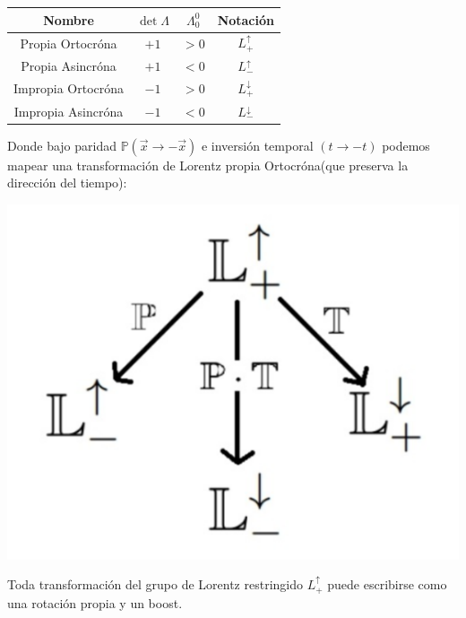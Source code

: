 \documentclass[../main]{subfiles}
\begin{document}
\begin{table}[h]
    \begin{center}
        \begin{tabular}{|c|c|c|c|}
            \hline
            Nombre & $\det \Lambda$ & $\Lambda^0_0$ & Notación \\ \hline
            Propia Ortocróna & $+1$ & $> 0$ & $L^{\uparrow}_{+}$ \\ \hline
            Propia Asincróna & $+1$ & $< 0$ & $L^{\uparrow}_{-}$ \\ \hline
            Impropia Ortocróna & $-1$ & $> 0$ & $L^{\downarrow}_{+}$ \\ \hline
            Impropia Asincróna & $-1$ & $< 0$ & $L^{\downarrow}_{-}$ \\ \hline
        \end{tabular}    
    \end{center}
\end{table}

Donde bajo paridad $\mathbb{P} (\vec{x}\rightarrow -\vec{x})$ e inversión temporal $(t\rightarrow -t)$ podemos mapear una transformación de Lorentz propia Ortocróna(que preserva la dirección del tiempo):
\begin{center}
    \includegraphics[scale=0.5]{img/imgRG2.3.PNG}
\end{center}

\teorema{} Toda transformación del grupo de Lorentz restringido $L^{\uparrow}_{+}$ puede escribirse como una rotación propia y un boost.
\end{document}
